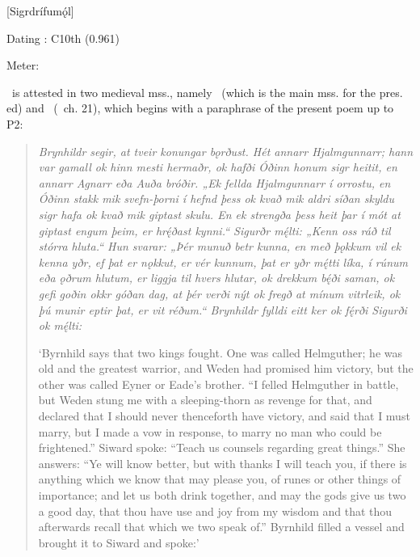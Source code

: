 [Sigrdrífumǫ́l]

\begin{flushright}%
Dating \parencite{Sapp2022}: C10th (0.961)

Meter: \Ljodahattr%
\end{flushright}



\Sigrdrifumal\ is attested in two medieval mss., namely \Regius\ (which is the main mss. for the pres. ed) and \VolsungaMS\ (\VolsungaSaga\ ch. 21), which begins with a paraphrase of the present poem up to P2:

\begin{quote}
  \emph{Brynhildr segir, at tveir konungar bǫrðust. Hét annarr Hjalmgunnarr; hann var gamall ok hinn mesti hermaðr, ok hafði Óðinn honum sigr heitit, en annarr Agnarr eða Auða bróðir. „Ek fellda Hjalmgunnarr í orrostu, en Óðinn stakk mik svefn-þorni í hefnd þess ok kvað mik aldri síðan skyldu sigr hafa ok kvað mik giptast skulu. En ek strengða þess heit þar í mót at giptast engum þeim, er hrę́ðast kynni.“ Sigurðr mę́lti: „Kenn oss ráð til stórra hluta.“ Hun svarar: „Þér munuð betr kunna, en með þǫkkum vil ek kenna yðr, ef þat er nǫkkut, er vér kunnum, þat er yðr mę́tti líka, í rúnum eða ǫðrum hlutum, er liggja til hvers hlutar, ok drekkum bę́ði saman, ok gefi goðin okkr góðan dag, at þér verði nýt ok fregð at mínum vitrleik, ok þú munir eptir þat, er vit réðum.“ Brynhildr fylldi eitt ker ok fę́rði Sigurði ok mę́lti:}

  ‘Byrnhild says that two kings fought. One was called Helmguther; he was old and the greatest warrior, and Weden had promised him victory,
  but the other was called Eyner or Eade’s brother. “I felled Helmguther in battle, but Weden stung me with a sleeping-thorn as revenge for that, and declared that I should never thenceforth have victory, and said that I must marry, but I made a vow in response, to marry no man who could be frightened.” Siward spoke: “Teach us counsels regarding great things.” She answers: “Ye will know better, but with thanks I will teach you, if there is anything which we know that may please you, of runes or other things of importance; and let us both drink together, and may the gods give us two a good day, that thou have use and joy from my wisdom and that thou afterwards recall that which we two speak of.” Byrnhild filled a vessel and brought it to Siward and spoke:’
\end{quote}

